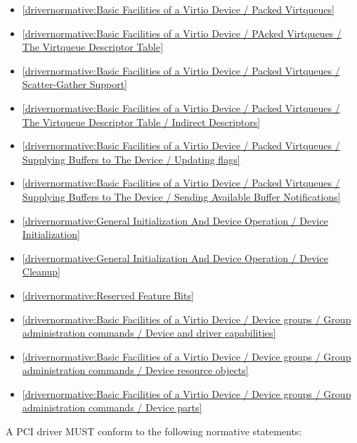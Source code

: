 \begin{itemize}
\item \ref{drivernormative:Basic Facilities of a Virtio Device / Packed Virtqueues}
\item \ref{drivernormative:Basic Facilities of a Virtio Device / PAcked Virtqueues / The Virtqueue Descriptor Table}
\item \ref{drivernormative:Basic Facilities of a Virtio Device / Packed Virtqueues / Scatter-Gather Support}
\item \ref{drivernormative:Basic Facilities of a Virtio Device / Packed Virtqueues / The Virtqueue Descriptor Table / Indirect Descriptors}
\item \ref{drivernormative:Basic Facilities of a Virtio Device / Packed Virtqueues / Supplying Buffers to The Device / Updating flags}
\item \ref{drivernormative:Basic Facilities of a Virtio Device / Packed Virtqueues / Supplying Buffers to The Device / Sending Available Buffer Notifications}
\item \ref{drivernormative:General Initialization And Device Operation / Device Initialization}
\item \ref{drivernormative:General Initialization And Device Operation / Device Cleanup}
\item \ref{drivernormative:Reserved Feature Bits}
\item \ref{drivernormative:Basic Facilities of a Virtio Device / Device groups / Group administration commands / Device and driver capabilities}
\item \ref{drivernormative:Basic Facilities of a Virtio Device / Device groups / Group administration commands / Device resource objects}
\item \ref{drivernormative:Basic Facilities of a Virtio Device / Device groups / Group administration commands / Device parts}
\end{itemize}

\label{sec:Conformance / Driver Conformance / PCI Driver Conformance}

A PCI driver MUST conform to the following normative statements:

